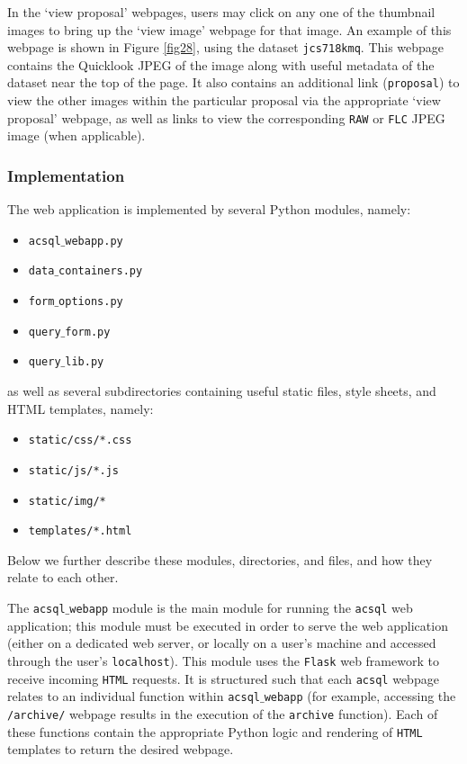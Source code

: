 \documentclass[10pt,journal,compsoc]{IEEEtran}
\begin{document}
In the `view proposal' webpages, users may click on any one of the thumbnail images to bring up the `view image' webpage for that image.  An example of this webpage is shown in
Figure \ref{fig28}, using the dataset \texttt{jcs718kmq}.  This webpage contains the Quicklook JPEG of the image along with useful metadata of the dataset near the top of the page.  It also
contains an additional link (\texttt{proposal}) to view the other images within the particular proposal via the appropriate `view proposal' webpage, as well as links to view the corresponding
\texttt{RAW} or \texttt{FLC} JPEG image (when applicable).


\subsubsection{Implementation}

The web application is implemented by several Python modules, namely:

\begin{itemize}
\item \texttt{acsql$\_$webapp.py}
\item \texttt{data$\_$containers.py}
\item \texttt{form$\_$options.py}
\item \texttt{query$\_$form.py}
\item \texttt{query$\_$lib.py}
\end{itemize}

\noindent as well as several subdirectories containing useful static files, style sheets, and HTML templates, namely:

\begin{itemize}
\item \texttt{static/css/*.css}
\item \texttt{static/js/*.js}
\item \texttt{static/img/*}
\item \texttt{templates/*.html}
\end{itemize}

\noindent Below we further describe these modules, directories, and files, and how they relate to each other.

The \texttt{acsql$\_$webapp} module is the main module for running the \texttt{acsql} web application; this module must be executed in order to serve the web application
(either on a dedicated web server, or locally on a user's machine and accessed through the user's \texttt{localhost}).  This module uses the \texttt{Flask} web framework to receive
incoming \texttt{HTML} requests.  It is structured such that each \texttt{acsql} webpage relates to an individual function within \texttt{acsql$\_$webapp} (for example, accessing the
\texttt{/archive/} webpage results in the execution of the \texttt{archive} function). Each of these functions contain the appropriate Python logic and rendering of \texttt{HTML}
templates to return the desired webpage.
\end{document}
